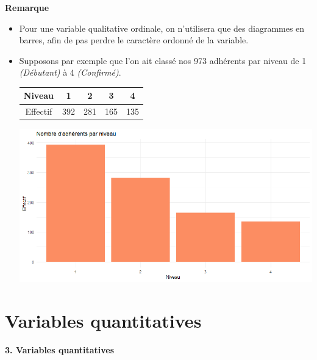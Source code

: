 \documentclass[aspectratio=169,xcolor=dvipsnames]{beamer}
\begin{document}
\begin{frame}
	\begin{exampleblock}{\textbf{Remarque}}
		\begin{itemize}
		\item Pour une variable qualitative ordinale, on n'utilisera que des diagrammes en barres, afin de pas perdre le caractère ordonné de la variable.
		\item Supposons par exemple que l'on ait classé nos 973 adhérents par niveau de 1 \emph{(Débutant)} à 4 \emph{(Confirmé)}.
			\begin{center}
			\begin{tabular}{ccccc}
			Niveau & 1 & 2 & 3 & 4 \\
			\hline
			Effectif & 392 & 281 & 165 & 135
			\end{tabular}
			\end{center}
			
			\begin{center}
			\includegraphics[scale=0.28]{barplot_gym3.png}
			\end{center}
		\end{itemize}
	\end{exampleblock}
\end{frame}

\section{Variables quantitatives}

\begin{frame}[plain]

\vfill

\begin{center}
{\huge \textcolor{nyubluedark}{\textbf{3. Variables quantitatives}}}
\end{center}

\vfill

\end{frame}
\end{document}
